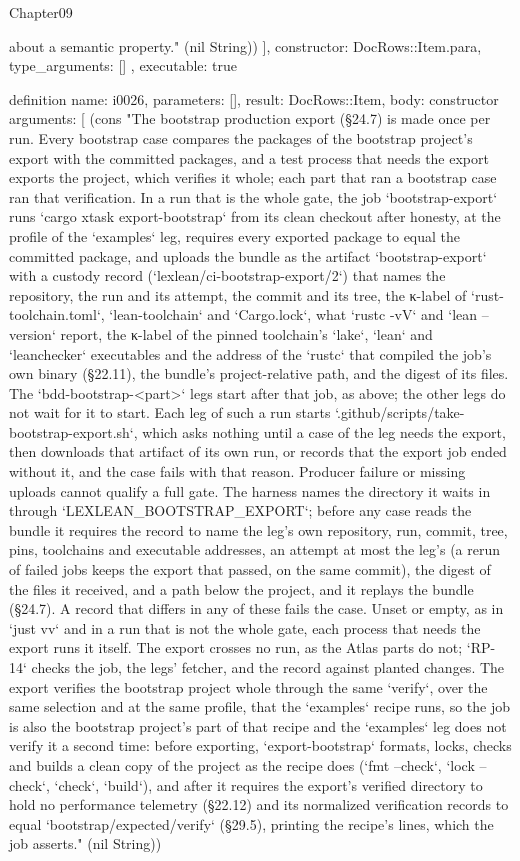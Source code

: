 \begin{lexlean}{Chapter09}
\begin{semanticmodule}
{{about a semantic property." (nil String))
    ],
    constructor: DocRows::Item.para,
    type_arguments: []
  },
  executable: true
}

definition{
  name: i0026,
  parameters: [],
  result: DocRows::Item,
  body: constructor{
    arguments: [
      (cons "The bootstrap production export (§24.7) is made once per run. Every bootstrap case compares the packages of the bootstrap project's export with the committed packages, and a test process that needs the export exports the project, which verifies it whole; each part that ran a bootstrap case ran that verification. In a run that is the whole gate, the job `bootstrap-export` runs `cargo xtask export-bootstrap` from its clean checkout after honesty, at the profile of the `examples` leg, requires every exported package to equal the committed package, and uploads the bundle as the artifact `bootstrap-export` with a custody record (`lexlean/ci-bootstrap-export/2`) that names the repository, the run and its attempt, the commit and its tree, the κ-label of `rust-toolchain.toml`, `lean-toolchain` and `Cargo.lock`, what `rustc -vV` and `lean --version` report, the κ-label of the pinned toolchain's `lake`, `lean` and `leanchecker` executables and the address of the `rustc` that compiled the job's own binary (§22.11), the bundle's project-relative path, and the digest of its files. The `bdd-bootstrap-<part>` legs start after that job, as above; the other legs do not wait for it to start. Each leg of such a run starts `.github/scripts/take-bootstrap-export.sh`, which asks nothing until a case of the leg needs the export, then downloads that artifact of its own run, or records that the export job ended without it, and the case fails with that reason. Producer failure or missing uploads cannot qualify a full gate. The harness names the directory it waits in through `LEXLEAN_BOOTSTRAP_EXPORT`; before any case reads the bundle it requires the record to name the leg's own repository, run, commit, tree, pins, toolchains and executable addresses, an attempt at most the leg's (a rerun of failed jobs keeps the export that passed, on the same commit), the digest of the files it received, and a path below the project, and it replays the bundle (§24.7). A record that differs in any of these fails the case. Unset or empty, as in `just vv` and in a run that is not the whole gate, each process that needs the export runs it itself. The export crosses no run, as the Atlas parts do not; `RP-14` checks the job, the legs' fetcher, and the record against planted changes. The export verifies the bootstrap project whole through the same `verify`, over the same selection and at the same profile, that the `examples` recipe runs, so the job is also the bootstrap project's part of that recipe and the `examples` leg does not verify it a second time: before exporting, `export-bootstrap` formats, locks, checks and builds a clean copy of the project as the recipe does (`fmt --check`, `lock --check`, `check`, `build`), and after it requires the export's verified directory to hold no performance telemetry (§22.12) and its normalized verification records to equal `bootstrap/expected/verify` (§29.5), printing the recipe's lines, which the job asserts." (nil String))
}}
\end{semanticmodule}
\end{lexlean}
